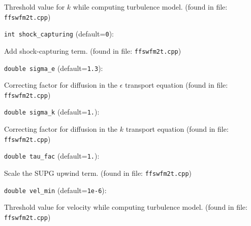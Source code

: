 Threshold value for $k$ while computing turbulence model.
 (found in file: \verb+ffswfm2t.cpp+)
\item\verb+int shock_capturing+ {\rm(default=\verb|0|)}:

Add shock-capturing term.
 (found in file: \verb+ffswfm2t.cpp+)
\item\verb+double sigma_e+ {\rm(default=\verb|1.3|)}:

Correcting factor for diffusion in the $\epsilon$ transport equation
 (found in file: \verb+ffswfm2t.cpp+)
\item\verb+double sigma_k+ {\rm(default=\verb|1.|)}:

Correcting factor for diffusion in the $k$ transport equation
 (found in file: \verb+ffswfm2t.cpp+)
\item\verb+double tau_fac+ {\rm(default=\verb|1.|)}:

Scale the SUPG upwind term. 
 (found in file: \verb+ffswfm2t.cpp+)
\item\verb+double vel_min+ {\rm(default=\verb|1e-6|)}:

Threshold value for velocity while computing turbulence model.
 (found in file: \verb+ffswfm2t.cpp+)
